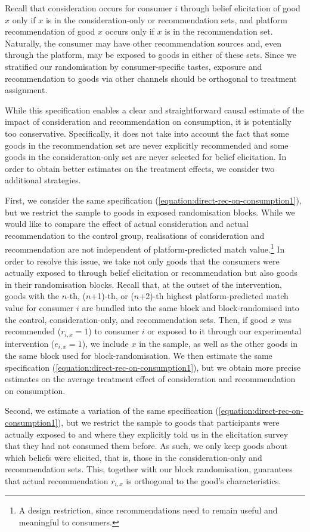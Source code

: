 \documentclass[12pt]{article}
\theoremstyle{newtheorem}
\begin{document}
Recall that consideration occurs for consumer $i$ through belief elicitation of good $x$ only if $x$ is in the consideration-only or recommendation sets, and platform recommendation of good $x$ occurs only if $x$ is in the recommendation set.
Naturally, the consumer may have other recommendation sources and, even through the platform, may be exposed to goods in either of these sets.
Since we stratified our randomisation by consumer-specific tastes, exposure and recommendation to goods via other channels should be orthogonal to treatment assignment.


While this specification enables a clear and straightforward causal estimate of the impact of consideration and recommendation on consumption, it is potentially too conservative.
Specifically, it does not take into account the fact that some goods in the recommendation set are never explicitly recommended and some goods in the consideration-only set are never selected for belief elicitation. 
In order to obtain better estimates on the treatment effects, we consider two additional strategies.


First, we consider the same specification (\ref{equation:direct-rec-on-consumption1}), but we restrict the sample to goods in exposed randomisation blocks.
While we would like to compare the effect of actual  consideration and actual recommendation to the control group, realisations of consideration and recommendation are not independent of platform-predicted match value.\footnote{
    A design restriction, since recommendations need to remain useful and meaningful to consumers.
} In order to resolve this issue, we take not only goods that the consumers were actually exposed to through belief elicitation or recommendation but also goods in their randomisation blocks.
Recall that, at the outset of the intervention, goods with the $n$-th, ($n$+1)-th, or ($n$+2)-th highest platform-predicted match value for consumer $i$ are bundled into the same block and block-randomised into the control, consideration-only, and recommendation sets. 
Then, if good $x$ was recommended ($r_{i,x}=1$) to consumer $i$ or exposed to it through our experimental intervention ($e_{i,x}=1$), we include $x$ in the sample, as well as the other goods in the same block used for block-randomisation.
We then estimate the same specification (\ref{equation:direct-rec-on-consumption1}), but we obtain more precise estimates on the average treatment effect of consideration and recommendation on consumption.


Second, we estimate a variation of the same specification (\ref{equation:direct-rec-on-consumption1}), but we restrict the sample to goods that participants were actually exposed to and where they explicitly told us in the elicitation survey that they had not consumed them before.
As such, we only keep goods about which beliefs were elicited, that is, those in the consideration-only and recommendation sets. 
This, together with our block randomisation, guarantees that actual recommendation $r_{i,x}$ is orthogonal to the good's characteristics.
\end{document}
